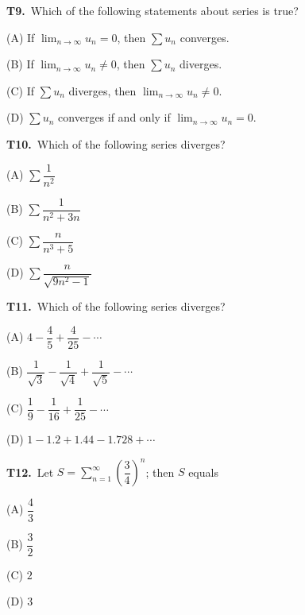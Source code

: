 \documentclass[11pt]{article}
\begin{document}
\bigskip\noindent\textbf{T9.}\ Which of the following statements about series is true?
\begin{list}{}{\setlength{\leftmargin}{3em}\setlength{\labelwidth}{2.5em}\setlength{\itemsep}{0pt}\setlength{\topsep}{2pt}}
\item[(A)] If $\displaystyle\lim_{n\to\infty} u_n=0$, then $\displaystyle\sum u_n$ converges.
\item[(B)] If $\displaystyle\lim_{n\to\infty} u_n\neq 0$, then $\displaystyle\sum u_n$ diverges.
\item[(C)] If $\displaystyle\sum u_n$ diverges, then $\displaystyle\lim_{n\to\infty} u_n\neq 0$.
\item[(D)] $\displaystyle\sum u_n$ converges if and only if $\displaystyle\lim_{n\to\infty} u_n=0$.
\end{list}

\bigskip\noindent\textbf{T10.}\ Which of the following series diverges?
\begin{list}{}{\setlength{\leftmargin}{3em}\setlength{\labelwidth}{2.5em}\setlength{\itemsep}{0pt}\setlength{\topsep}{2pt}}
\item[(A)] $\displaystyle\sum \dfrac{1}{n^2}$
\item[(B)] $\displaystyle\sum \dfrac{1}{n^2+3n}$
\item[(C)] $\displaystyle\sum \dfrac{n}{n^3+5}$
\item[(D)] $\displaystyle\sum \dfrac{n}{\sqrt{9n^2-1}}$
\end{list}

\bigskip\noindent\textbf{T11.}\ Which of the following series diverges?
\begin{list}{}{\setlength{\leftmargin}{3em}\setlength{\labelwidth}{2.5em}\setlength{\itemsep}{0pt}\setlength{\topsep}{2pt}}
\item[(A)] $4-\dfrac{4}{5}+\dfrac{4}{25}-\cdots$
\item[(B)] $\dfrac{1}{\sqrt{3}}-\dfrac{1}{\sqrt{4}}+\dfrac{1}{\sqrt{5}}-\cdots$
\item[(C)] $\dfrac{1}{9}-\dfrac{1}{16}+\dfrac{1}{25}-\cdots$
\item[(D)] $1-1.2+1.44-1.728+\cdots$
\end{list}

\bigskip\noindent\textbf{T12.}\ Let $S=\displaystyle\sum_{n=1}^\infty \left(\dfrac{3}{4}\right)^n$; then $S$ equals
\begin{list}{}{\setlength{\leftmargin}{3em}\setlength{\labelwidth}{2.5em}\setlength{\itemsep}{0pt}\setlength{\topsep}{2pt}}
\item[(A)] $\dfrac{4}{3}$
\item[(B)] $\dfrac{3}{2}$
\item[(C)] $2$
\item[(D)] $3$
\end{list}
\end{document}
